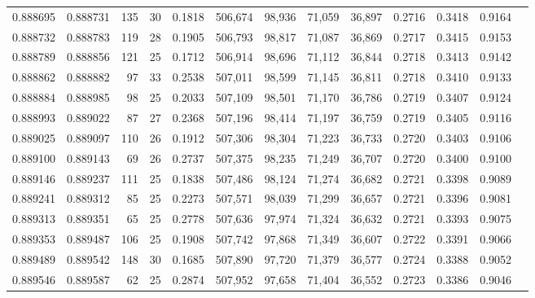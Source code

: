 \begin{tabular}{rrrrrrrrrrrrr}
0.888695 & 0.888731 &   135 &  30 &                                     0.1818 & 506,674 &  98,936 &  71,059 &  36,897 & 0.2716 & 0.3418 & 0.9164 \\
0.888732 & 0.888783 &   119 &  28 &                                     0.1905 & 506,793 &  98,817 &  71,087 &  36,869 & 0.2717 & 0.3415 & 0.9153 \\
0.888789 & 0.888856 &   121 &  25 &                                     0.1712 & 506,914 &  98,696 &  71,112 &  36,844 & 0.2718 & 0.3413 & 0.9142 \\
0.888862 & 0.888882 &    97 &  33 &                                     0.2538 & 507,011 &  98,599 &  71,145 &  36,811 & 0.2718 & 0.3410 & 0.9133 \\
0.888884 & 0.888985 &    98 &  25 &                                     0.2033 & 507,109 &  98,501 &  71,170 &  36,786 & 0.2719 & 0.3407 & 0.9124 \\
0.888993 & 0.889022 &    87 &  27 &                                     0.2368 & 507,196 &  98,414 &  71,197 &  36,759 & 0.2719 & 0.3405 & 0.9116 \\
0.889025 & 0.889097 &   110 &  26 &                                     0.1912 & 507,306 &  98,304 &  71,223 &  36,733 & 0.2720 & 0.3403 & 0.9106 \\
0.889100 & 0.889143 &    69 &  26 &                                     0.2737 & 507,375 &  98,235 &  71,249 &  36,707 & 0.2720 & 0.3400 & 0.9100 \\
0.889146 & 0.889237 &   111 &  25 &                                     0.1838 & 507,486 &  98,124 &  71,274 &  36,682 & 0.2721 & 0.3398 & 0.9089 \\
0.889241 & 0.889312 &    85 &  25 &                                     0.2273 & 507,571 &  98,039 &  71,299 &  36,657 & 0.2721 & 0.3396 & 0.9081 \\
0.889313 & 0.889351 &    65 &  25 &                                     0.2778 & 507,636 &  97,974 &  71,324 &  36,632 & 0.2721 & 0.3393 & 0.9075 \\
0.889353 & 0.889487 &   106 &  25 &                                     0.1908 & 507,742 &  97,868 &  71,349 &  36,607 & 0.2722 & 0.3391 & 0.9066 \\
0.889489 & 0.889542 &   148 &  30 &                                     0.1685 & 507,890 &  97,720 &  71,379 &  36,577 & 0.2724 & 0.3388 & 0.9052 \\
0.889546 & 0.889587 &    62 &  25 &                                     0.2874 & 507,952 &  97,658 &  71,404 &  36,552 & 0.2723 & 0.3386 & 0.9046 \\

\end{tabular}
